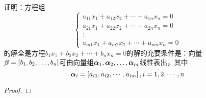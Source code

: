 \begin{problem}\label{problem-2.38}
证明：方程组
\begin{equation*}
    \begin{cases}
        a_{11}x_1+a_{12}x_2+\cdots+a_{1n}x_n=0 \\
        a_{21}x_1+a_{22}x_2+\cdots+a_{2n}x_n=0 \\
        \vdots                                 \\
        a_{m1}x_1+a_{m2}x_2+\cdots+a_{mn}x_n=0
    \end{cases}
\end{equation*}
的解全是方程\(b_1x_1+b_2x_2+\cdots+b_nx_n=0\)的解的充要条件是：向量\(\boldsymbol{\beta}=\left[ {b}_1,{b}_2,\dots,{b}_{n} \right]\)可由向量组\({\boldsymbol{\alpha}}_1,{\boldsymbol{\alpha}}_2,\dots,{\boldsymbol{\alpha}}_{m}\)线性表出，其中
\begin{equation*}
    \boldsymbol{\alpha}_i=\left[ a_{i1},a_{i2},\cdots,a_{im} \right],i=1,2,\cdots,n
\end{equation*}
\end{problem}
\begin{proof}
\end{proof}

